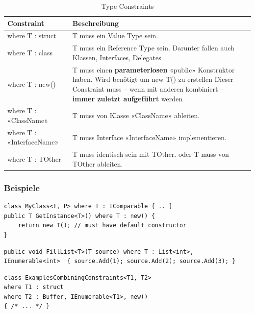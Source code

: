 \documentclass[
a4paper,
oneside,
10pt,
fleqn,
headsepline,
toc=listofnumbered, 
bibliography=totocnumbered]{scrartcl}
\begin{document}
\begin{table}[ht]
	\centering
	\begin{tabu} to \linewidth {l X}
		\toprule
		Constraint                & Beschreibung                                                                                           \\
		\midrule
		where T : struct          & T muss ein Value Type sein.                                                                            \\
		where T : class           & T muss ein Reference Type sein. Darunter fallen auch Klassen, Interfaces, Delegates                    \\
		where T : new()           & T muss einen \textbf{parameterlosen} «public» Konstruktor haben. Wird benötigt um new T() zu erstellen
		Dieser Constraint muss – wenn mit anderen kombiniert – \textbf{immer zuletzt
		aufgeführt} werden                                                                                                                 \\
		where T : «ClassName»     & T muss von Klasse «ClassName» ableiten.                                                                \\
		where T : «InterfaceName» & T muss Interface «InterfaceName» implementieren.                                                       \\
		where T : TOther          & T muss identisch sein mit TOther.
		oder
		T muss von TOther ableiten.                                                                                                        \\
		\bottomrule
	\end{tabu}
	\caption{Type Constraints}
\end{table}
\subsubsection{Beispiele}
\begin{lstlisting}
class MyClass<T, P> where T : IComparable { .. }
public T GetInstance<T>() where T : new() {
	return new T(); // must have default constructor
}
\end{lstlisting}

\begin{lstlisting}
public void FillList<T>(T source) where T : List<int>, IEnumerable<int>  { source.Add(1); source.Add(2); source.Add(3); }
\end{lstlisting}


\begin{lstlisting}
class ExamplesCombiningConstraints<T1, T2>
where T1 : struct 
where T2 : Buffer, IEnumerable<T1>, new()
{ /* ... */ } 
\end{lstlisting}
\end{document}
